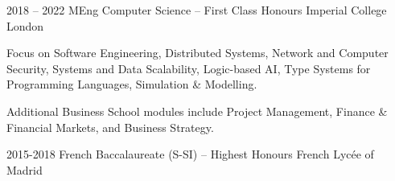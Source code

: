 \begin{entrylist}
    \entry
    {2018 -- 2022}
    {MEng Computer Science -- First Class Honours}
    {Imperial College London}
    {
        Focus on Software Engineering,
        Distributed Systems,
        Network and Computer Security,
        Systems and Data Scalability,
        Logic-based AI,
        Type Systems for Programming Languages,
        Simulation \& Modelling.

        \para
        Additional Business School modules include Project Management, Finance \& Financial Markets, and
    Business Strategy.
    }
    \entry
    {2015-2018}
    {French Baccalaureate (S-SI) -- Highest Honours}
    {French Lycée of Madrid}
    {
        \vspace{-0.10\textwidth}
    }
\end{entrylist}

